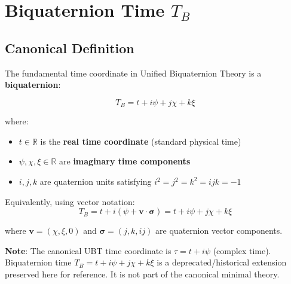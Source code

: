 

\section{Biquaternion Time $T_B$}
\label{sec:canonical:biquaternion_time}

\subsection{Canonical Definition}

The fundamental time coordinate in Unified Biquaternion Theory is a \textbf{biquaternion}:

\begin{equation}
\label{eq:canonical:biquaternion_time}
\boxed{T_B = t + i\psi + j\chi + k\xi}
\end{equation}

\noindent where:
\begin{itemize}
    \item $t \in \mathbb{R}$ is the \textbf{real time coordinate} (standard physical time)
    \item $\psi, \chi, \xi \in \mathbb{R}$ are \textbf{imaginary time components}
    \item $i, j, k$ are quaternion units satisfying $i^2 = j^2 = k^2 = ijk = -1$
\end{itemize}

Equivalently, using vector notation:
\begin{equation}
\label{eq:canonical:biquaternion_time_vector}
T_B = t + i(\psi + \mathbf{v} \cdot \boldsymbol{\sigma}) = t + i\psi + j\chi + k\xi
\end{equation}

where $\mathbf{v} = (\chi, \xi, 0)$ and $\boldsymbol{\sigma} = (j, k, ij)$ are quaternion vector components.

\textbf{Note}: The canonical UBT time coordinate is $\tau = t + i\psi$ (complex time). Biquaternion time $T_B = t + i\psi + j\chi + k\xi$ is a deprecated/historical extension preserved here for reference. It is not part of the canonical minimal theory.

